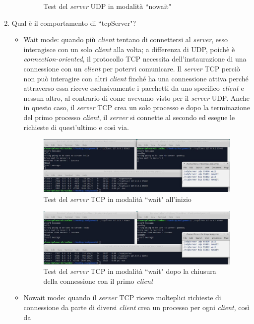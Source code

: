 \documentclass[a4paper, 12pt]{report}
\begin{document}
\begin{enumerate}
\begin{itemize}
\begin{figure}[H]
			\caption{Test del \textit{server} UDP in modalità ``nowait"}
		\end{figure}
	\end{itemize}
	\item Qual è il comportamento di ``tcpServer"?
	\begin{itemize}
		\item Wait mode: quando più \textit{client} tentano di connettersi al \textit{server}, esso interagisce con un solo \textit{client} alla volta; a differenza di UDP,
		poichè è \textit{connection-oriented}, il protocollo TCP necessita dell'instaurazione di una connessione con un \textit{client} per potervi comunicare.
		Il \textit{server} TCP perciò non può interagire con altri \textit{client} finché ha una connessione attiva perché attraverso essa riceve esclusivamente i pacchetti da uno
		specifico \textit{client} e nessun altro, al contrario di come avevamo visto per il \textit{server} UDP. Anche in questo caso, il \textit{server} TCP crea un solo
		processo e dopo la terminazione del primo processo \textit{client}, il \textit{server} si connette al secondo ed esegue le richieste di quest'ultimo e così via.
		\begin{figure}[H]
			\centering
			\includegraphics[width=\linewidth]{images/launch_tcpClientWait.JPG}
			\caption{Test del \textit{server} TCP in modalità ``wait" all'inizio}
		\end{figure}
		\begin{figure}[H]
			\centering
			\includegraphics[width=\linewidth]{images/launch_tcpClientWait_2.JPG}
			\caption{Test del \textit{server} TCP in modalità ``wait" dopo la chiusura della connessione con il primo \textit{client}}
		\end{figure}
		\item Nowait mode: quando il \textit{server} TCP riceve molteplici richieste di connessione da parte di diversi \textit{client} crea un processo per ogni \textit{client}, così da

\end{itemize}
\end{enumerate}
\end{document}
